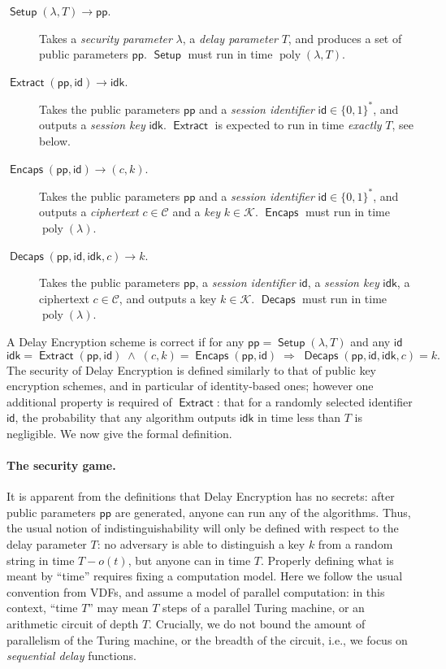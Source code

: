 \documentclass{llncs}
\DeclareMathOperator{\poly}{poly}
\DeclareMathOperator{\Setup}{\mathsf{Setup}}
\DeclareMathOperator{\Extract}{\mathsf{Extract}}
\DeclareMathOperator{\Encaps}{\mathsf{Encaps}}
\DeclareMathOperator{\Decaps}{\mathsf{Decaps}}
\newcommand{\pp}{\mathsf{pp}}
\newcommand{\id}{\mathsf{id}}
\newcommand{\idk}{\mathsf{idk}}
\newcommand{\keyspace}{\mathcal{K}}
\newcommand{\cipherspace}{\mathcal{C}}
\begin{document}
\begin{description}
\item[$\Setup(\lambda, T) \to \pp$.] %
  Takes a \emph{security parameter} $\lambda$, a \emph{delay
    parameter} $T$, and produces a set of public parameters $\pp$. %
  $\Setup$ must run in time $\poly(\lambda,T)$.
\item[$\Extract(\pp,\id) \to \idk$.] %
  Takes the public parameters $\pp$ and a \emph{session identifier}
  $\id\in\{0,1\}^*$, and outputs a \emph{session key} $\idk$. %
  $\Extract$ is expected to run in time \emph{exactly} $T$, see below.
\item[$\Encaps(\pp,\id)\to (c,k)$.] %
  Takes the public parameters $\pp$ and a \emph{session identifier}
  $\id\in\{0,1\}^*$, and outputs a \emph{ciphertext}
  $c\in\cipherspace$ and a \emph{key} $k\in\keyspace$. %
  $\Encaps$ must run in time $\poly(\lambda)$.
\item[$\Decaps(\pp,\id,\idk,c)\to k$.] %
  Takes the public parameters $\pp$, a \emph{session identifier}
  $\id$, a \emph{session key} $\idk$, a ciphertext $c\in\cipherspace$,
  and outputs a key $k\in\keyspace$. %
  $\Decaps$ must run in time $\poly(\lambda)$.
\end{description}

A Delay Encryption scheme is correct if for any
$\pp=\Setup(\lambda,T)$ and any $\id$
\[\idk=\Extract(\pp,\id)
  \;\wedge\;
  (c,k) = \Encaps(\pp,\id)
  \;\Rightarrow\;
  \Decaps(\pp,\id,\idk,c) = k.\]
The security of Delay Encryption is defined similarly to that of
public key encryption schemes, and in particular of identity-based
ones; however one additional property is required of $\Extract$: that
for a randomly selected identifier $\id$, the probability that any
algorithm outputs $\idk$ in time less than $T$ is negligible. %
We now give the formal definition.

\paragraph{The security game.} It is apparent from the definitions
that Delay Encryption has no secrets: after public parameters $\pp$
are generated, anyone can run any of the algorithms. %
Thus, the usual notion of indistinguishability will only be defined
with respect to the delay parameter $T$: no adversary is able to
distinguish a key $k$ from a random string in time $T-o(t)$, but
anyone can in time $T$. %
Properly defining what is meant by ``time'' requires fixing a
computation model. %
Here we follow the usual convention from VDFs, and assume a model of
parallel computation: in this context, ``time $T$'' may mean $T$ steps
of a parallel Turing machine, or an arithmetic circuit of depth $T$. %
Crucially, we do not bound the amount of parallelism of the Turing
machine, or the breadth of the circuit, i.e., we focus on
\emph{sequential delay} functions.
\end{document}
